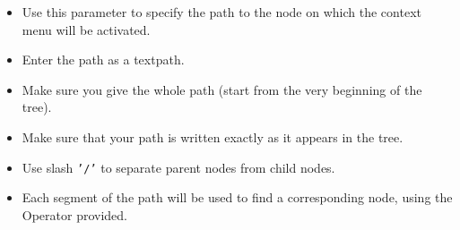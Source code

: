 \begin{itemize}
\item Use this parameter to specify the path to the node on which the context menu will be activated.
\item Enter the path as a textpath.
\item Make sure you give the whole path (start from the very beginning of the tree).
\item Make sure that your path is written exactly as it appears in the tree. 
\item Use slash {\tt '/'} to separate parent nodes from child nodes.
\item Each segment of the path will be used to find a corresponding node, using the Operator provided.
\end{itemize}

    